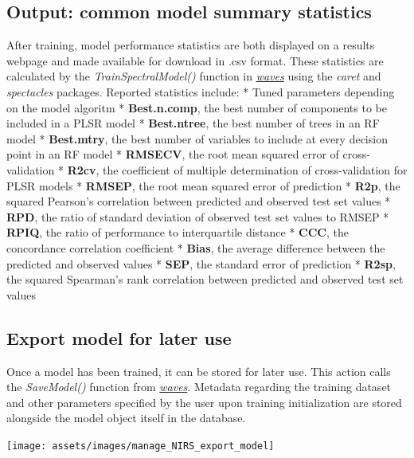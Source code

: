 \documentclass[
  12pt,
]{book}
\begin{document}
\hypertarget{output-common-model-summary-statistics}{%
\subsection{Output: common model summary statistics}\label{output-common-model-summary-statistics}}

After training, model performance statistics are both displayed on a results webpage and made available for download in .csv format. These statistics are calculated by the \emph{TrainSpectralModel()} function in \href{https://CRAN.R-project.org/package=waves}{\emph{waves}} using the \emph{caret} and \emph{spectacles} packages. Reported statistics include: * Tuned parameters depending on the model algoritm * \textbf{Best.n.comp}, the best number of components to be included in a PLSR model * \textbf{Best.ntree}, the best number of trees in an RF model * \textbf{Best.mtry}, the best number of variables to include at every decision point in an RF model * \textbf{RMSECV}, the root mean squared error of cross-validation * \textbf{R2cv}, the coefficient of multiple determination of cross-validation for PLSR models * \textbf{RMSEP}, the root mean squared error of prediction * \textbf{R2p}, the squared Pearson's correlation between predicted and observed test set values * \textbf{RPD}, the ratio of standard deviation of observed test set values to RMSEP * \textbf{RPIQ}, the ratio of performance to interquartile distance * \textbf{CCC}, the concordance correlation coefficient * \textbf{Bias}, the average difference between the predicted and observed values * \textbf{SEP}, the standard error of prediction * \textbf{R2sp}, the squared Spearman's rank correlation between predicted and observed test set values

\hypertarget{export-model-for-later-use}{%
\subsection{Export model for later use}\label{export-model-for-later-use}}

Once a model has been trained, it can be stored for later use. This action calls the \emph{SaveModel()} function from \href{https://CRAN.R-project.org/package=waves}{\emph{waves}}. Metadata regarding the training dataset and other parameters specified by the user upon training initialization are stored alongside the model object itself in the database.

\begin{center}\texttt{[image: assets/images/manage\_NIRS\_export\_model]} \end{center}
\end{document}

